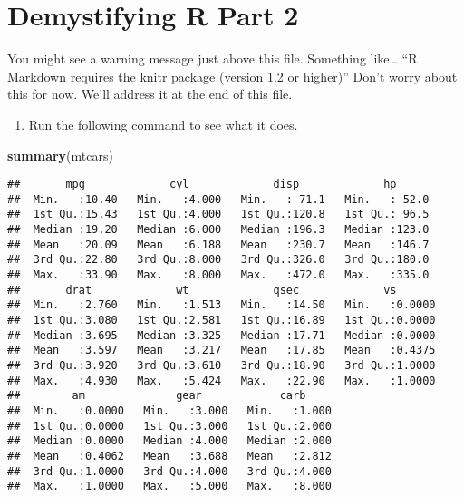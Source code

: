 \documentclass[]{article}
\title{}
\author{}
\date{}
\newenvironment{Shaded}{\begin{snugshade}}{\end{snugshade}}
\newcommand{\KeywordTok}[1]{\textcolor[rgb]{0.13,0.29,0.53}{\textbf{#1}}}
\newcommand{\NormalTok}[1]{#1}
\providecommand{\tightlist}{%
  \setlength{\itemsep}{0pt}\setlength{\parskip}{0pt}}
\begin{document}
\section{Demystifying R Part 2}\label{demystifying-r-part-2}

You might see a warning message just above this file. Something
like\ldots{} ``R Markdown requires the knitr package (version 1.2 or
higher)'' Don't worry about this for now. We'll address it at the end of
this file.

\begin{enumerate}
\def\labelenumi{\arabic{enumi}.}
\tightlist
\item
  Run the following command to see what it does.
\end{enumerate}

\begin{Shaded}
\begin{Highlighting}[]
\KeywordTok{summary}\NormalTok{(mtcars)}
\end{Highlighting}
\end{Shaded}

\begin{verbatim}
##       mpg             cyl             disp             hp       
##  Min.   :10.40   Min.   :4.000   Min.   : 71.1   Min.   : 52.0  
##  1st Qu.:15.43   1st Qu.:4.000   1st Qu.:120.8   1st Qu.: 96.5  
##  Median :19.20   Median :6.000   Median :196.3   Median :123.0  
##  Mean   :20.09   Mean   :6.188   Mean   :230.7   Mean   :146.7  
##  3rd Qu.:22.80   3rd Qu.:8.000   3rd Qu.:326.0   3rd Qu.:180.0  
##  Max.   :33.90   Max.   :8.000   Max.   :472.0   Max.   :335.0  
##       drat             wt             qsec             vs        
##  Min.   :2.760   Min.   :1.513   Min.   :14.50   Min.   :0.0000  
##  1st Qu.:3.080   1st Qu.:2.581   1st Qu.:16.89   1st Qu.:0.0000  
##  Median :3.695   Median :3.325   Median :17.71   Median :0.0000  
##  Mean   :3.597   Mean   :3.217   Mean   :17.85   Mean   :0.4375  
##  3rd Qu.:3.920   3rd Qu.:3.610   3rd Qu.:18.90   3rd Qu.:1.0000  
##  Max.   :4.930   Max.   :5.424   Max.   :22.90   Max.   :1.0000  
##        am              gear            carb      
##  Min.   :0.0000   Min.   :3.000   Min.   :1.000  
##  1st Qu.:0.0000   1st Qu.:3.000   1st Qu.:2.000  
##  Median :0.0000   Median :4.000   Median :2.000  
##  Mean   :0.4062   Mean   :3.688   Mean   :2.812  
##  3rd Qu.:1.0000   3rd Qu.:4.000   3rd Qu.:4.000  
##  Max.   :1.0000   Max.   :5.000   Max.   :8.000
\end{verbatim}
\end{document}

